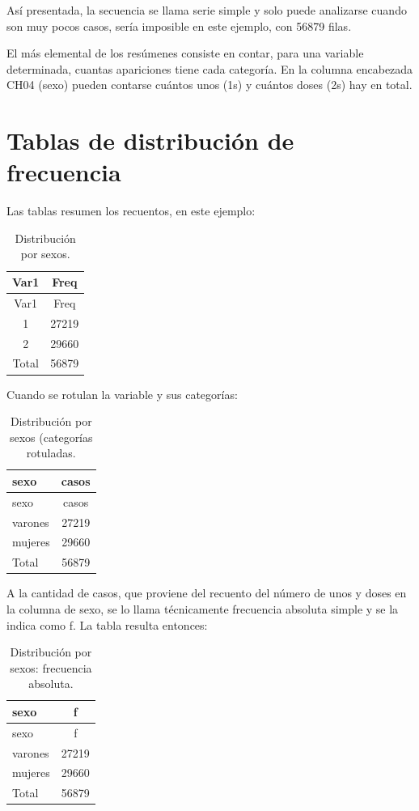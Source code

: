 \documentclass[]{book}
\begin{document}
Así presentada, la secuencia se llama serie simple y solo puede analizarse cuando son muy pocos casos, sería imposible en este ejemplo, con 56879 filas.

El más elemental de los resúmenes consiste en contar, para una variable determinada, cuantas apariciones tiene cada categoría. En la columna encabezada CH04 (sexo) pueden contarse cuántos unos (1s) y cuántos doses (2s) hay en total.

\hypertarget{tablas-de-distribuciuxf3n-de-frecuencia}{%
\section{Tablas de distribución de frecuencia}\label{tablas-de-distribuciuxf3n-de-frecuencia}}

Las tablas resumen los recuentos, en este ejemplo:

\begin{longtable}[]{@{}cc@{}}
\caption{\label{tab:unnamed-chunk-39}Distribución por sexos.}\tabularnewline
\toprule
Var1 & Freq\tabularnewline
\midrule
\endfirsthead
\toprule
Var1 & Freq\tabularnewline
\midrule
\endhead
1 & 27219\tabularnewline
2 & 29660\tabularnewline
Total & 56879\tabularnewline
\bottomrule
\end{longtable}

Cuando se rotulan la variable y sus categorías:

\begin{longtable}[]{@{}lc@{}}
\caption{\label{tab:unnamed-chunk-40}Distribución por sexos (categorías rotuladas.}\tabularnewline
\toprule
sexo & casos\tabularnewline
\midrule
\endfirsthead
\toprule
sexo & casos\tabularnewline
\midrule
\endhead
varones & 27219\tabularnewline
mujeres & 29660\tabularnewline
Total & 56879\tabularnewline
\bottomrule
\end{longtable}

A la cantidad de casos, que proviene del recuento del número de unos y doses en la columna de sexo, se lo llama técnicamente frecuencia absoluta simple y se la indica como f. La tabla resulta entonces:

\begin{longtable}[]{@{}lc@{}}
\caption{\label{tab:unnamed-chunk-41}Distribución por sexos: frecuencia absoluta.}\tabularnewline
\toprule
sexo & f\tabularnewline
\midrule
\endfirsthead
\toprule
sexo & f\tabularnewline
\midrule
\endhead
varones & 27219\tabularnewline
mujeres & 29660\tabularnewline
Total & 56879\tabularnewline
\bottomrule
\end{longtable}
\end{document}
